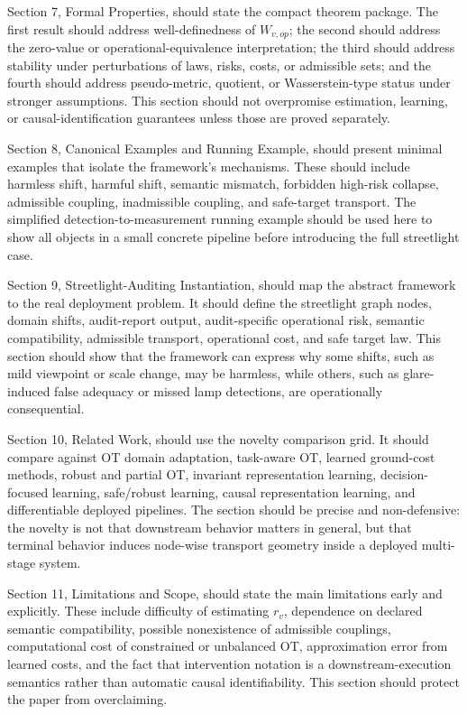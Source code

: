 \documentclass[11pt,a4paper]{article}
\begin{document}
Section 7, Formal Properties, should state the compact theorem package. The first result should address well-definedness of \(W_{v,op}\); the second should address the zero-value or operational-equivalence interpretation; the third should address stability under perturbations of laws, risks, costs, or admissible sets; and the fourth should address pseudo-metric, quotient, or Wasserstein-type status under stronger assumptions. This section should not overpromise estimation, learning, or causal-identification guarantees unless those are proved separately.

Section 8, Canonical Examples and Running Example, should present minimal examples that isolate the framework's mechanisms. These should include harmless shift, harmful shift, semantic mismatch, forbidden high-risk collapse, admissible coupling, inadmissible coupling, and safe-target transport. The simplified detection-to-measurement running example should be used here to show all objects in a small concrete pipeline before introducing the full streetlight case.

Section 9, Streetlight-Auditing Instantiation, should map the abstract framework to the real deployment problem. It should define the streetlight graph nodes, domain shifts, audit-report output, audit-specific operational risk, semantic compatibility, admissible transport, operational cost, and safe target law. This section should show that the framework can express why some shifts, such as mild viewpoint or scale change, may be harmless, while others, such as glare-induced false adequacy or missed lamp detections, are operationally consequential.

Section 10, Related Work, should use the novelty comparison grid. It should compare against OT domain adaptation, task-aware OT, learned ground-cost methods, robust and partial OT, invariant representation learning, decision-focused learning, safe/robust learning, causal representation learning, and differentiable deployed pipelines. The section should be precise and non-defensive: the novelty is not that downstream behavior matters in general, but that terminal behavior induces node-wise transport geometry inside a deployed multi-stage system.

Section 11, Limitations and Scope, should state the main limitations early and explicitly. These include difficulty of estimating \(r_v\), dependence on declared semantic compatibility, possible nonexistence of admissible couplings, computational cost of constrained or unbalanced OT, approximation error from learned costs, and the fact that intervention notation is a downstream-execution semantics rather than automatic causal identifiability. This section should protect the paper from overclaiming.
\end{document}
